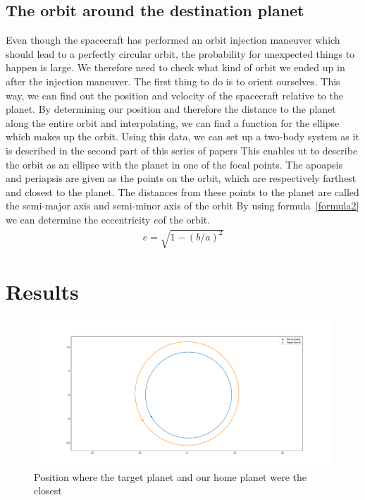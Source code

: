 \documentclass[reprint,english,notitlepage]{revtex4-2}
\begin{document}
\subsection{The orbit around the destination planet}\label{subsec:the-orbit-around-the-destination-planet}
    Even though the spacecraft has performed an orbit injection maneuver which should lead to a perfectly circular orbit, the probability for unexpected things to happen is large.
    We therefore need to check what kind of orbit we ended up in after the injection maneuver.
    The first thing to do is to orient ourselves.
    This way, we can find out the position and velocity of the spacecraft relative to the planet.
    By determining our position and therefore the distance to the planet along the entire orbit and interpolating, we can find a function for the ellipse which makes up the orbit.
    Using this data, we can set up a two-body system as it is described in the second part of this series of papers%
    This enables ut to describe the orbit as an ellipse with the planet in one of the focal points.
    The apoapsis and periapsis are given as the points on the orbit, which are respectively farthest and closest to the planet.
    The distances from these points to the planet are called the semi-major axis and semi-minor axis of the orbit
    By using formula~\eqref{formula2} we can determine the eccentricity $e$of the orbit.
    \begin{align}
        e = \sqrt{1-(b/a)^2} \label{formula2}
    \end{align}



    \section{Results} \label{sec: results}

    \begin{figure}[h]
      \centering
      \includegraphics[scale = .125]{Figures/closest_orbit}
      \caption{Position where the target planet and our home planet were the closest}
      \label{fig: closest orbit}
    \end{figure}
\end{document}
